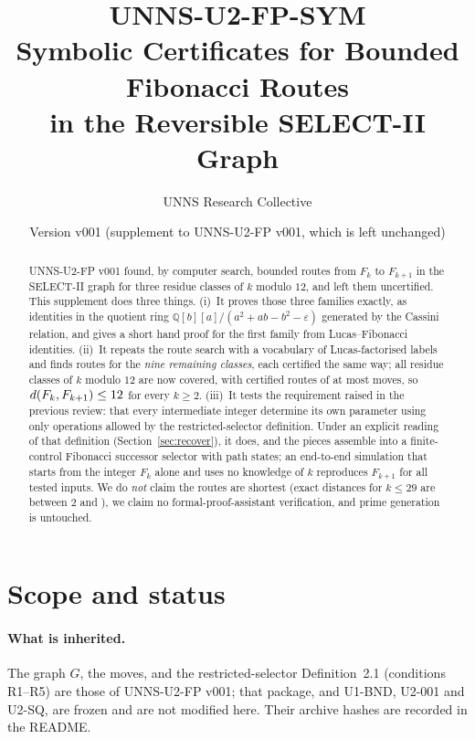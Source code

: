 \documentclass[11pt]{article}
\title{\textbf{UNNS-U2-FP-SYM}\\[2pt]\large Symbolic Certificates for Bounded Fibonacci Routes\\ in the Reversible SELECT-II Graph}
\author{UNNS Research Collective}
\date{Version v001 \quad (supplement to UNNS-U2-FP v001, which is left unchanged)}
\theoremstyle{definition}
\theoremstyle{remark}
\newcommand{\Q}{\mathbb{Q}}
\begin{document}
\maketitle
\begin{abstract}
\noindent
UNNS-U2-FP v001 found, by computer search, bounded routes from $F_k$ to $F_{k+1}$ in the SELECT-II graph for three residue classes of $k$ modulo $12$, and left them uncertified. This supplement does three things. (i)~It proves those three families exactly, as identities in the quotient ring $\Q[b][a]/(a^2+ab-b^2-\varepsilon)$ generated by the Cassini relation, and gives a short hand proof for the first family from Lucas--Fibonacci identities. (ii)~It repeats the route search with a vocabulary of Lucas-factorised labels and finds routes for the \emph{nine remaining classes}, each certified the same way; all \NCov{} residue classes of $k$ modulo $12$ are now covered, with certified routes of at most \MaxLen{} moves, so $d(F_k,F_{k+1})\le12$ for every $k\ge2$. (iii)~It tests the requirement raised in the previous review: that every intermediate integer determine its own parameter using only operations allowed by the restricted-selector definition. Under an explicit reading of that definition (Section~\ref{sec:recover}), it does, and the pieces assemble into a finite-control Fibonacci successor selector with \CtlStates{} path states; an end-to-end simulation that starts from the integer $F_k$ alone and uses no knowledge of $k$ reproduces $F_{k+1}$ for all \NSelTest{} tested inputs. We do \emph{not} claim the routes are shortest (exact distances for $k\le 29$ are between $2$ and \NSmallMax{}), we claim no formal-proof-assistant verification, and prime generation is untouched.
\end{abstract}

\section{Scope and status}
\paragraph{What is inherited.} The graph $G$, the moves, and the restricted-selector Definition~2.1 (conditions R1--R5) are those of UNNS-U2-FP v001; that package, and U1-BND, U2-001 and U2-SQ, are frozen and are not modified here. Their archive hashes are recorded in the README.
\end{document}
